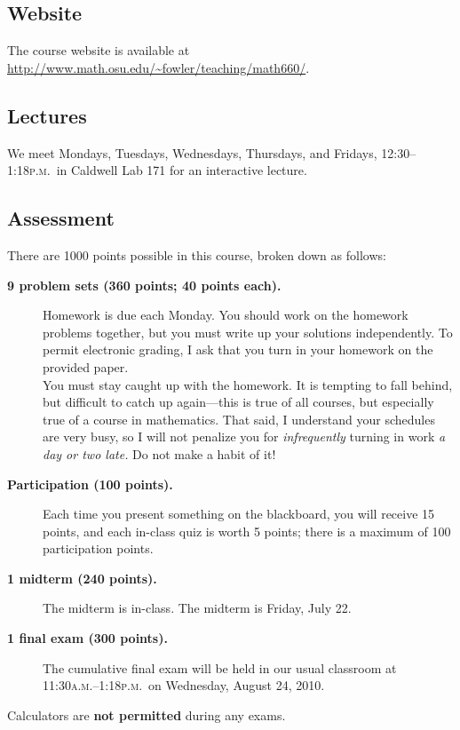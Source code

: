 \documentclass[12pt]{handout}
\newcommand{\peem}{\textsc{p.m.}}
\newcommand{\ayem}{\textsc{a.m.}}
\begin{document}
\subsection*{Website}
The course website is available at \url{http://www.math.osu.edu/~fowler/teaching/math660/}.

\subsection*{Lectures}
We meet Mondays, Tuesdays, Wednesdays, Thursdays, and Fridays,
12:30--1:18\peem\ in Caldwell Lab 171 for an interactive lecture.

\subsection*{Assessment}

There are 1000 points possible in this course, broken down as
follows:
\begin{description}
\item[\textsf{\textbf{9 problem sets (360 points; 40 points each).}}]  Homework is due each Monday.  You should work on the homework
  problems together, but you must write up your solutions
  independently. To permit electronic grading, I ask that you turn in your homework on the provided paper.\vspace{1ex}\\
You must stay caught up with the homework.  It is tempting to fall behind, but difficult
to catch up again---this is true of all courses, but especially true
of a course in mathematics.  That said, I understand your schedules
are very busy, so I will not penalize you for \textit{infrequently}
turning in work \textit{a day or two late.}  Do not make a habit of
it!




\item[\textsf{\textbf{Participation (100 points).}}]  Each time you present something on the blackboard, you will receive 15 points, and each in-class quiz is worth 5 points; there is a maximum of 100 participation points.

\item[\textsf{\textbf{1 midterm (240 points).}}]  The midterm is in-class.
The midterm is Friday, July 22.

\item[\textsf{\textbf{1 final exam (300 points).}}]  The cumulative final exam will be held in our usual classroom at
11:30\ayem--1:18\peem\ on Wednesday, August 24, 2010.
\end{description}

\noindent%
Calculators are \textbf{not permitted} during any exams.
\vspace{1ex}
\end{document}
